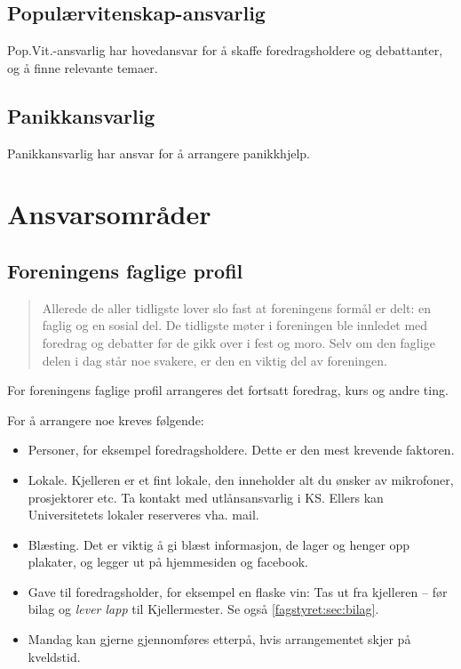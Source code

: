 \subsection{Populærvitenskap-ansvarlig}
Pop.Vit.-ansvarlig har hovedansvar for å skaffe foredragsholdere og debattanter,
og å finne relevante temaer.

\subsection{Panikkansvarlig}
Panikkansvarlig har ansvar for å arrangere panikkhjelp.

\section{Ansvarsområder}
\subsection{Foreningens faglige profil}
\begin{quote}
	Allerede de aller tidligste lover slo fast at foreningens formål er delt: en
	faglig og en sosial del. De tidligste møter i foreningen ble innledet
	med foredrag og debatter før de gikk over i fest og moro. Selv om den
	faglige delen i dag står noe svakere, er den en viktig del av
	foreningen.
\end{quote}

For foreningens faglige profil arrangeres det fortsatt foredrag, kurs og andre
ting.

For å arrangere noe kreves følgende:
\begin{itemize}
	\item Personer, for eksempel foredragsholdere. Dette er den mest
	      krevende faktoren.
	\item Lokale. 
          Kjelleren er et fint lokale, den inneholder alt du ønsker av
          mikrofoner, prosjektorer etc. Ta kontakt med utlånsansvarlig i KS.
          Ellers kan Universitetets lokaler reserveres vha. mail.
	\item Blæsting. Det er viktig å gi blæst informasjon, de lager og henger
          opp plakater, og legger ut på hjemmesiden og facebook. 
	\item Gave til foredragsholder, for eksempel en flaske vin: 
          Tas ut fra kjelleren -- før bilag og \emph{lever lapp} til
          Kjellermester. Se også \ref{fagstyret:sec:bilag}.
	\item Mandag
          kan gjerne gjennomføres etterpå, hvis arrangementet skjer på
          kveldstid.
\end{itemize}

